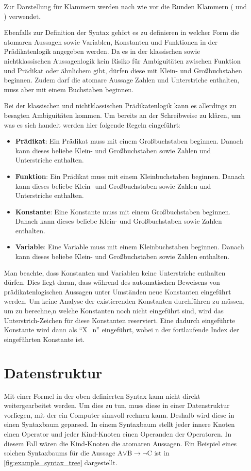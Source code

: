 Zur Darstellung für Klammern werden nach wie vor die Runden Klammern ( und ) verwendet.

Ebenfalls zur Definition der Syntax gehört es zu definieren in welcher Form die atomaren Aussagen sowie Variablen, Konstanten und Funktionen in der Prädikatenlogik angegeben werden. Da es in der klassischen sowie nichtklassischen Aussagenlogik kein Risiko für Ambiguitäten zwischen Funktion und Prädikat oder ähnlichem gibt, dürfen diese mit Klein- und Großbuchstaben beginnen. Zudem darf die atomare Aussage Zahlen und Unterstriche enthalten, muss aber mit einem Buchstaben beginnen.

Bei der klassischen und nichtklassischen Prädikatenlogik kann es allerdings zu besagten Ambiguitäten kommen. Um bereits an der Schreibweise zu klären, um was es sich handelt werden hier folgende Regeln eingeführt:
\begin{itemize}
\item \textbf{Prädikat}: Ein Prädikat muss mit einem Großbuchstaben beginnen. Danach kann dieses beliebe Klein- und Großbuchstaben sowie Zahlen und Unterstriche enthalten.

\item \textbf{Funktion}: Ein Prädikat muss mit einem Kleinbuchstaben beginnen. Danach kann dieses beliebe Klein- und Großbuchstaben sowie Zahlen und Unterstriche enthalten.

\item \textbf{Konstante}: Eine Konstante muss mit einem Großbuchstaben beginnen. Danach kann dieses beliebe Klein- und Großbuchstaben sowie Zahlen enthalten.

\item \textbf{Variable}: Eine Variable muss mit einem Kleinbuchstaben beginnen. Danach kann dieses beliebe Klein- und Großbuchstaben sowie Zahlen enthalten.
\end{itemize}

Man beachte, dass Konstanten und Variablen keine Unterstriche enthalten dürfen. Dies liegt daran, dass während des automatischen Beweisens von prädikatenlogischen Aussagen unter Umständen neue Konstanten eingeführt werden. Um keine Analyse der existierenden Konstanten durchführen zu müssen, um zu berechne,n welche Konstanten noch nicht eingeführt sind, wird das Unterstrich-Zeichen für diese Konstanten reserviert. Eine dadurch eingeführte Konstante wird dann als ``X\_n'' eingeführt, wobei n der fortlaufende Index der eingeführten Konstante ist.


\section{Datenstruktur}
Mit einer Formel in der oben definierten Syntax kann nicht direkt weitergearbeitet werden. Um dies zu tun, muss diese in einer Datenstruktur vorliegen, mit der ein Computer sinnvoll rechnen kann.
Deshalb wird diese in einen Syntaxbaum geparsed. In einem Syntaxbaum stellt jeder innere Knoten einen Operator und jeder Kind-Knoten einen Operanden der Operatoren. \cite{compiler_dragon_book} In diesem Fall wären die Kind-Knoten die atomaren Aussagen. Ein Beispiel eines solchen Syntaxbaums für die Aussage A$\vee$B$\rightarrow\neg$C ist in \autoref{fig:example_syntax_tree} dargestellt.

